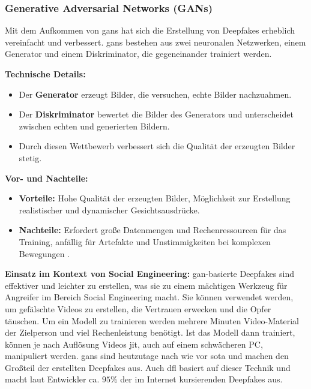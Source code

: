 \subsubsection{Generative Adversarial Networks (GANs)}\label{subsubsec:gans}

Mit dem Aufkommen von \glspl{gan} hat sich die Erstellung von Deepfakes erheblich vereinfacht und verbessert.
\glspl{gan} bestehen aus zwei neuronalen Netzwerken, einem Generator und einem Diskriminator, die gegeneinander trainiert werden.\cite{Deepfakes-a-survey-and-introduction-to-the-topical-collection}

\textbf{Technische Details:}
\begin{itemize}
    \item Der \textbf{Generator} erzeugt Bilder, die versuchen, echte Bilder nachzuahmen.
    \item Der \textbf{Diskriminator} bewertet die Bilder des Generators und unterscheidet zwischen echten und generierten Bildern.
    \item Durch diesen Wettbewerb verbessert sich die Qualität der erzeugten Bilder stetig.
\end{itemize}

\textbf{Vor- und Nachteile:}
\begin{itemize}
    \item \textbf{Vorteile:} Hohe Qualität der erzeugten Bilder, Möglichkeit zur Erstellung realistischer und dynamischer Gesichtsausdrücke.
    \item \textbf{Nachteile:} Erfordert große Datenmengen und Rechenressourcen für das Training, anfällig für Artefakte und Unstimmigkeiten bei komplexen Bewegungen \cite{Deepfakes-An-Overview}.
\end{itemize}

\textbf{Einsatz im Kontext von Social Engineering:} \gls{gan}-basierte Deepfakes sind effektiver und leichter zu erstellen, was sie zu einem mächtigen Werkzeug für Angreifer im Bereich Social Engineering macht.
Sie können verwendet werden, um gefälschte Videos zu erstellen, die Vertrauen erwecken und die Opfer täuschen.
Um ein Modell zu trainieren werden mehrere Minuten Video-Material der Zielperson und viel Rechenleistung benötigt.
Ist das Modell dann trainiert, können je nach Auflösung Videos \gls{jit}, auch auf einem schwächeren PC, manipuliert werden.
\glspl{gan} sind heutzutage nach wie vor \gls{sota} und machen den Großteil der erstellten Deepfakes aus.
Auch \gls{dfl} basiert auf dieser Technik und macht laut Entwickler ca. $95\%$ der im Internet kursierenden Deepfakes aus\cite{dfl-github-repo}.

